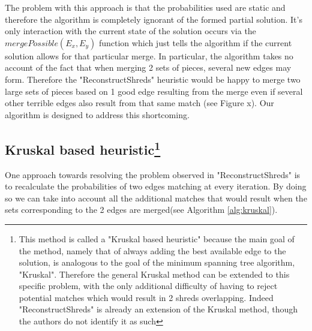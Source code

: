 The problem with this approach is that the probabilities used are static and therefore the algorithm is completely ignorant of the formed partial solution. It's only interaction with the current state of the solution occurs via the $mergePossible(E_x,E_y)$ function which just tells the algorithm if the current solution allows for that particular merge. In particular, the algorithm takes no account of the fact that when merging 2 sets of pieces, several new edges may form. Therefore the "ReconstructShreds" heuristic would be happy to merge two large sets of pieces based on 1 good edge resulting from the merge even if several other terrible edges also result from that same match (see Figure x).
Our algorithm is designed to address this shortcoming.

\subsection[Kruskal based heuristic] {Kruskal based heuristic\footnote{This method is called a "Kruskal based heuristic" because the main goal of the method, namely that of always adding the best available edge to the solution, is analogous to the goal of the minimum spanning tree algorithm, "Kruskal"\cite{P9}. Therefore the general Kruskal method can be extended to this specific problem, with the only additional difficulty of having to reject potential matches which would result in 2 shreds overlapping. Indeed "ReconstructShreds" is already an extension of the Kruskal method, though the authors do not identify it as such}} 
One approach towards resolving the problem observed in "ReconstructShreds" is to recalculate the probabilities of two edges matching at every iteration. By doing so we can take into account all the additional matches that would result when the sets corresponding to the 2 edges are merged(see Algorithm \ref{alg:kruskal}). 

